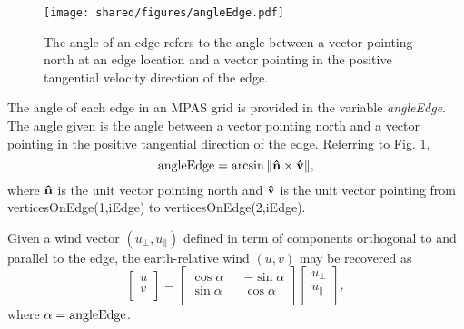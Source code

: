 \begin{figure}[htb]
\begin{center}
\texttt{[image: shared/figures/angleEdge.pdf]}
\caption{The angle of an edge refers to the angle between a vector pointing north at an edge location
and a vector pointing in the positive tangential velocity direction of the edge.}
\label{fig:angleEdge}
\end{center}
\end{figure}

The angle of each edge in an MPAS grid is provided in the variable {\it angleEdge}. The angle
given is the angle between a vector pointing north and a vector pointing in the
positive tangential direction of the edge. Referring to Fig. \ref{fig:angleEdge},
\[ {\rm angleEdge} = \arcsin\|{\bf \hat n} \times {\bf \hat v}\|, \]
where ${\bf \hat n}$ is the unit vector pointing north and ${\bf \hat v}$ is the unit vector
pointing from verticesOnEdge(1,iEdge) to verticesOnEdge(2,iEdge).

Given a wind vector $(u_\perp, u_\parallel)$ defined in term of components orthogonal to
and parallel to the edge, the earth-relative wind $(u,v)$ may be recovered as
\[
\begin{bmatrix}
u \\
v \\
\end{bmatrix}
=
\begin{bmatrix}
\cos\alpha && -\sin\alpha \\
\sin\alpha && \cos\alpha \\
\end{bmatrix}
\begin{bmatrix}
u_\perp \\
u_\parallel \\
\end{bmatrix},
\]
where $\alpha = {\rm angleEdge}$.




